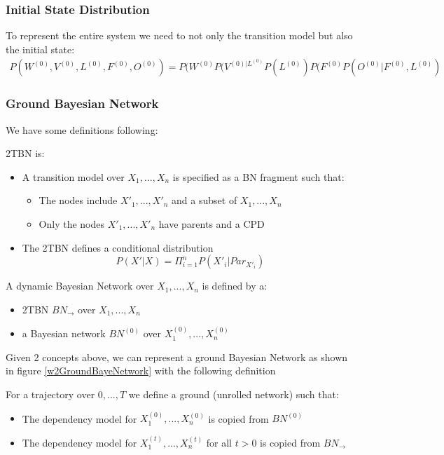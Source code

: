 \subsubsection{Initial State Distribution}
To represent the entire system we need to not only the transition model but also the initial state:
\begin{align}
P(W^{(0)}, V^{(0)}, L^{(0)}, F^{(0)}, O^{(0)}) = P(W^{(0)} P(V^{(0)| L^{(0)}} P(L^{(0)}) P(F^{(0)}P(O^{(0)} | F^{(0)}, L^{(0)})
\end{align}

\subsubsection{Ground Bayesian Network}
We have some definitions following:
\begin{defi}
2TBN is:
\begin{itemize}
	\item A transition model over $X_1,...,X_n$ is specified as a BN fragment such that:
	\begin{itemize}
		\item The nodes include $X'_1,...,X'_n$ and a subset of $X_1,...,X_n$
		\item Only the nodes $X'_1,...,X'_n$ have parents and a CPD
	\end{itemize}
	\item The 2TBN defines a conditional distribution
	\[ P(X'|X) = \Pi_{i=1}^{n} P(X'_i | Par_{X'_i}) \]
\end{itemize}	
\end{defi}

\begin{defi}
A dynamic Bayesian Network over $X_1,...,X_n$ is defined by a:
\begin{itemize}
	\item 2TBN $BN_\rightarrow$ over $X_1,...,X_n$
	\item a Bayesian network $BN^{(0)}$ over $X_1^{(0)},...,X_n^{(0)}$
\end{itemize}
\end{defi}

Given 2 concepts above, we can represent a ground Bayesian Network as shown in figure \ref{w2GroundBayeNetwork} with the following definition
\begin{defi}
	For a trajectory over $0,...,T$ we define a ground (unrolled network) such that:
	\begin{itemize}
		\item The dependency model for $X_1^{(0)},...,X_n^{(0)}$ is copied from $BN^{(0)}$
		\item The dependency model for $X_1^{(t)},...,X_n^{(t)}$ for all $t>0$ is copied from $BN_\rightarrow$
	\end{itemize}
\end{defi}

